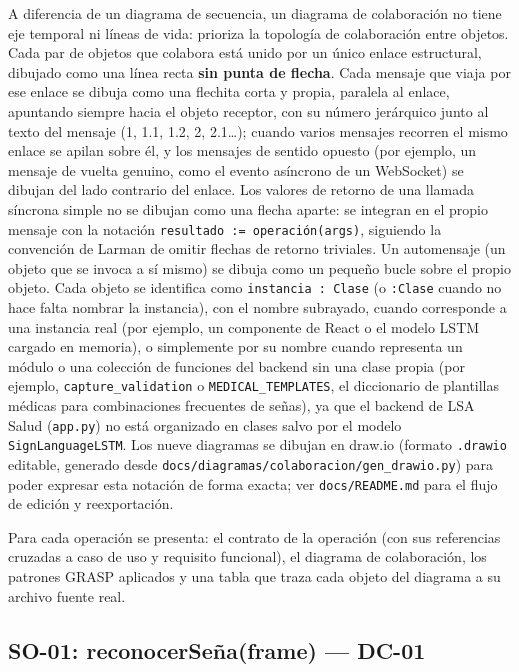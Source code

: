 A diferencia de un diagrama de secuencia, un diagrama de colaboración no
tiene eje temporal ni líneas de vida: prioriza la topología de
colaboración entre objetos. Cada par de objetos que colabora está unido por
un único enlace estructural, dibujado como una línea recta \textbf{sin
punta de flecha}. Cada mensaje que viaja por ese enlace se dibuja como una
flechita corta y propia, paralela al enlace, apuntando siempre hacia el
objeto receptor, con su número jerárquico junto al texto del mensaje (1,
1.1, 1.2, 2, 2.1\ldots); cuando varios mensajes recorren el mismo enlace se
apilan sobre él, y los mensajes de sentido opuesto (por ejemplo, un mensaje
de vuelta genuino, como el evento asíncrono de un WebSocket) se dibujan del
lado contrario del enlace. Los valores de retorno de una llamada síncrona
simple no se dibujan como una flecha aparte: se integran en el propio
mensaje con la notación \texttt{resultado := operación(args)}, siguiendo la
convención de Larman de omitir flechas de retorno triviales. Un
automensaje (un objeto que se invoca a sí mismo) se dibuja como un pequeño
bucle sobre el propio objeto. Cada objeto se identifica como
\texttt{instancia~:~Clase} (o \texttt{:Clase} cuando no hace falta nombrar
la instancia), con el nombre subrayado, cuando corresponde a una instancia
real (por ejemplo, un componente de React o el modelo LSTM cargado en
memoria), o simplemente por su nombre cuando representa un módulo o una
colección de funciones del backend sin una clase propia (por ejemplo,
\texttt{capture\_validation} o \texttt{MEDICAL\_TEMPLATES}, el diccionario
de plantillas médicas para combinaciones frecuentes de señas), ya que el
backend de LSA Salud (\texttt{app.py}) no está organizado en clases salvo por el
modelo \texttt{SignLanguageLSTM}. Los nueve diagramas se dibujan en
draw.io (formato \texttt{.drawio} editable, generado desde
\texttt{docs/diagramas/colaboracion/gen\_drawio.py}) para poder expresar
esta notación de forma exacta; ver \texttt{docs/README.md} para el flujo de
edición y reexportación.

Para cada operación se presenta: el contrato de la operación (con sus
referencias cruzadas a caso de uso y requisito funcional), el diagrama de
colaboración, los patrones GRASP aplicados y una tabla que traza cada objeto
del diagrama a su archivo fuente real.

\subsection{SO-01: reconocerSeña(frame) --- DC-01}

